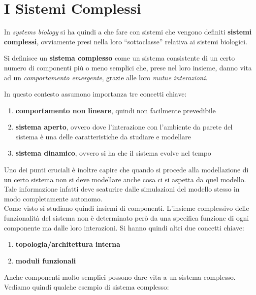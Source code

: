 \documentclass[a4paper,12pt, oneside]{book}
\begin{document}
\section{I Sistemi Complessi}
In \textit{systems biology} si ha quindi a che fare con sistemi che vengono
definiti \textbf{sistemi complessi}, ovviamente presi nella loro ``sottoclasse''
relativa ai sistemi biologici.
\begin{definizione}
  Si definisce un \textbf{sistema complesso} come un sistema consistente di un
  certo numero di componenti più o meno semplici che, prese nel loro insieme,
  danno vita ad un \textit{comportamento emergente}, grazie alle loro
  \textit{mutue interazioni}. 
\end{definizione}
In questo contesto assumono importanza tre concetti chiave:
\begin{enumerate}
  \item \textbf{comportamento non lineare}, quindi non facilmente prevedibile
  \item \textbf{sistema aperto}, ovvero dove l'interazione con l'ambiente da
  parete del sistema è una delle caratteristiche da studiare e modellare
  \item \textbf{sistema dinamico}, ovvero si ha che il sistema evolve nel tempo 
\end{enumerate}
Uno dei punti cruciali è inoltre capire che quando si procede alla modellazione
di un certo sistema non si deve modellare anche cosa ci si aspetta da quel
modello. Tale informazione infatti deve scaturire dalle simulazioni del modello
stesso in modo completamente autonomo.\\
Come visto si studiano quindi insiemi di componenti. L'insieme complessivo delle
funzionalità del sistema non è determinato però da una specifica funzione di
ogni componente ma dalle loro interazioni. Si hanno quindi altri due concetti
chiave:
\begin{enumerate}
  \item \textbf{topologia/architettura interna}
  \item \textbf{moduli funzionali}
\end{enumerate}
Anche componenti molto semplici possono dare vita a un sistema complesso.\\ 
Vediamo quindi qualche esempio di sistema complesso:
\end{document}
